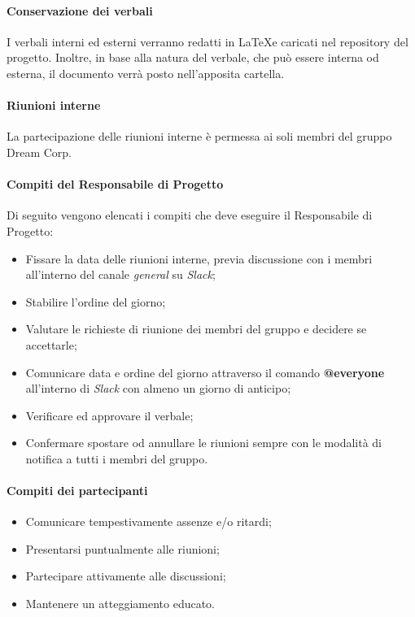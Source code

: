                         \paragraph{Conservazione dei verbali}
                            I verbali interni ed esterni verranno redatti in \LaTeX e caricati nel repository del progetto.
                            Inoltre, in base alla natura del verbale, che può essere interna od esterna, il documento verrà posto nell'apposita cartella.
                    \paragraph{Riunioni interne}
                        La partecipazione delle riunioni interne è permessa ai soli membri del gruppo Dream Corp.
                        \newline
                        \paragraph{Compiti del Responsabile di Progetto}
                            Di seguito vengono elencati i compiti che deve eseguire il Responsabile di Progetto:
                            \begin{itemize}
                                \item Fissare la data delle riunioni interne, previa discussione con i membri all'interno del canale \textit{general} su \textit{Slack};
                                \item Stabilire l'ordine del giorno;
                                \item Valutare le richieste di riunione dei membri del gruppo e decidere se accettarle;
                                \item Comunicare data e ordine del giorno attraverso il comando \textbf{@everyone} all'interno di \textit{Slack} con almeno un giorno di anticipo;
                                \item Verificare ed approvare il verbale;
                                \item Confermare spostare od annullare le riunioni sempre con le modalità di notifica a tutti i membri del gruppo.
                             \end{itemize}
                         \paragraph{Compiti dei partecipanti}
                            \begin{itemize}
                                \item Comunicare tempestivamente assenze e/o ritardi; 
                                \item Presentarsi puntualmente alle riunioni;
                                \item Partecipare attivamente alle discussioni;
                                \item Mantenere un atteggiamento educato.
                            \end{itemize}
